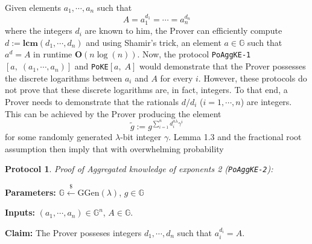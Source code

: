 \documentclass[11pt, lettersize, notitlepage, leqno, footskip=0.6cm]{article}
\newcommand{\slim}{\sum\limits}
\newcommand{\wti}{\widetilde}
\newcommand{\mb}{\mathbb}
\newcommand{\mbf}{\mathbf}
\newcommand{\mr}{\mathrm}
\newcommand{\lam}{\lambda}
\newcommand{\lamb}{\lambda}
\newcommand{\vs}{\vspace{-0.15cm}}
\newcommand{\noin}{\noindent}
\newcommand{\LCM}{\mbf{lcm}}
\newtheorem{Prot}[Thm]{Protocol}
\numberwithin{equation}{section}
\begin{document}
\noin Given elements $a_1,\cdots,a_n$ such that \vs $$A = a_1^{d_1} =\cdots = a_n^{d_n} $$ where the integers $d_i$ are known to him, the Prover can efficiently compute $d:= \LCM(d_1,\cdots,d_n)$ and  using Shamir's trick, an element $a\in\mb{G}$ such that $a^d = A$ in runtime $\mbf{O}(n\log(n))$. Now, the protocol \verb|PoAggKE-1|$[a,\;(a_1,\cdots,a_n)]$ and \verb|PoKE|$[a,\;A]$ would demonstrate that the Prover possesses the discrete logarithms between $a_i$ and $A$ for every $i$. However, these protocols do not prove that these discrete logarithms are, in fact, integers. To that end, a Prover needs to demonstrate that the rationals $d/d_i$ ($i=1,\cdots, n$) are integers. This can be achieved by the Prover producing the element \vs $$\wti{g}:= g^{\slim_{i=1}^{n}d_i^{n\lam}\gamma^i} $$ for some randomly generated $\lam$-bit integer $\gamma$. Lemma 1.3 and the fractional root assumption then imply that with overwhelming probability

\vspace{0.2cm}

\begin{Prot} \normalfont \textit{Proof of Aggregated knowledge of exponents} 2 (\verb|PoAggKE-2|): \end{Prot}\vspace{-0.25cm}

\noindent \textbf{Parameters:} $\mb{G}\xleftarrow{\$} \mr{GGen}(\lamb)$,\; $g\in \mb{G}$ 

\noindent \textbf{Inputs:} $(a_1,\cdots,a_n) \in \mb{G}^n$, $A\in\mb{G}$.

\noindent \textbf{Claim:} The Prover posseses integers $d_1,\cdots,d_n$ such that $a_i^{d_i} = A$.
\end{document}
